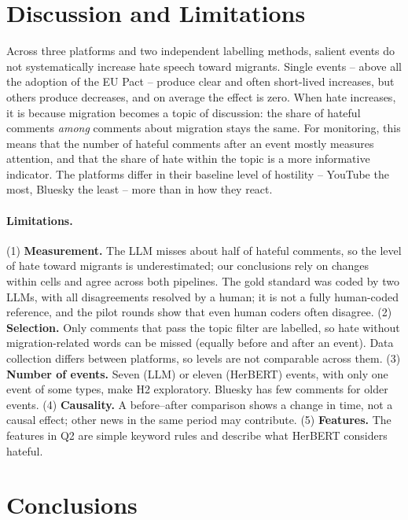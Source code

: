 \documentclass[11pt]{article}
\begin{document}
\section{Discussion and Limitations}

Across three platforms and two independent labelling methods, salient events do not systematically increase hate speech toward migrants. Single events -- above all the adoption of the EU Pact -- produce clear and often short-lived increases, but others produce decreases, and on average the effect is zero. When hate increases, it is because migration becomes a topic of discussion: the share of hateful comments \emph{among} comments about migration stays the same. For monitoring, this means that the number of hateful comments after an event mostly measures attention, and that the share of hate within the topic is a more informative indicator. The platforms differ in their baseline level of hostility -- YouTube the most, Bluesky the least -- more than in how they react.

\paragraph{Limitations.}
(1) \textbf{Measurement.} The LLM misses about half of hateful comments, so the level of hate toward migrants is underestimated; our conclusions rely on changes within cells and agree across both pipelines. The gold standard was coded by two LLMs, with all disagreements resolved by a human; it is not a fully human-coded reference, and the pilot rounds show that even human coders often disagree.
(2) \textbf{Selection.} Only comments that pass the topic filter are labelled, so hate without migration-related words can be missed (equally before and after an event). Data collection differs between platforms, so levels are not comparable across them.
(3) \textbf{Number of events.} Seven (LLM) or eleven (HerBERT) events, with only one event of some types, make H2 exploratory. Bluesky has few comments for older events.
(4) \textbf{Causality.} A before--after comparison shows a change in time, not a causal effect; other news in the same period may contribute.
(5) \textbf{Features.} The features in Q2 are simple keyword rules and describe what HerBERT considers hateful.

\section{Conclusions}
\end{document}
